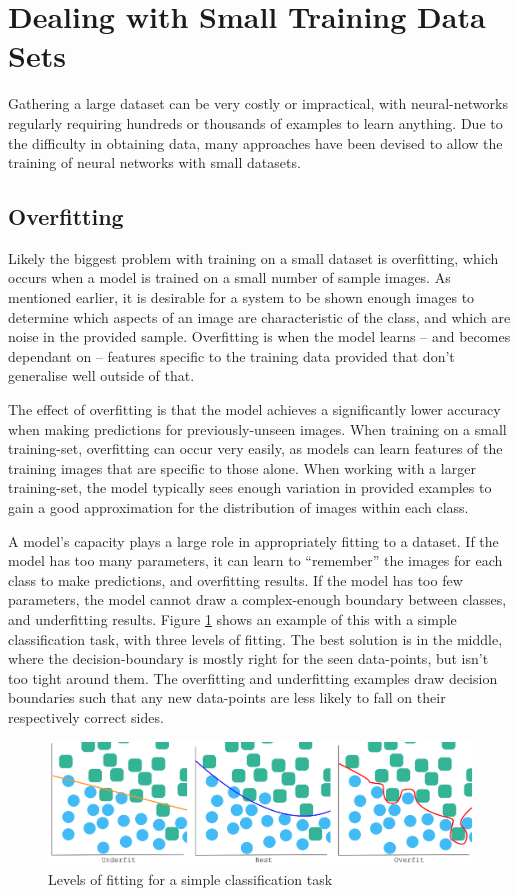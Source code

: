 \documentclass{report}
\begin{document}
\section{Dealing with Small Training Data Sets}
Gathering a large dataset can be very costly or impractical, with neural-networks regularly requiring hundreds or thousands of examples to learn anything. Due to the difficulty in obtaining data, many approaches have been devised to allow the training of neural networks with small datasets. \par

\subsection{Overfitting}
Likely the biggest problem with training on a small dataset is overfitting, which occurs when a model is trained on a small number of sample images. As mentioned earlier, it is desirable for a system to be shown enough images to determine which aspects of an image are characteristic of the class, and which are noise in the provided sample. Overfitting is when the model learns -- and becomes dependant on -- features specific to the training data provided that don't generalise well outside of that. \par
The effect of overfitting is that the model achieves a significantly lower accuracy when making predictions for previously-unseen images. When training on  a small training-set, overfitting can occur very easily, as models can learn features of the training images that are specific to those alone. When working with a larger training-set, the model typically sees enough variation in provided examples to gain a good approximation for the distribution of images within each class. \par
A model's capacity plays a large role in appropriately fitting to a dataset. If the model has too many parameters, it can learn to ``remember'' the images for each class to make predictions, and overfitting results. If the model has too few parameters, the model cannot draw a complex-enough boundary between classes, and underfitting results. Figure \ref{fig:fitting:1} shows an example of this with a simple classification task, with three levels of fitting. The best solution is in the middle, where the decision-boundary is mostly right for the seen data-points, but isn't too tight around them. The overfitting and underfitting examples draw decision boundaries such that any new data-points are less likely to fall on their respectively correct sides. \par
\begin{figure}[!h]
 \centering
 \includegraphics[width=14cm]{fitting}
 \caption{Levels of fitting for a simple classification task}
 \label{fig:fitting:1}
\end{figure}
\end{document}

